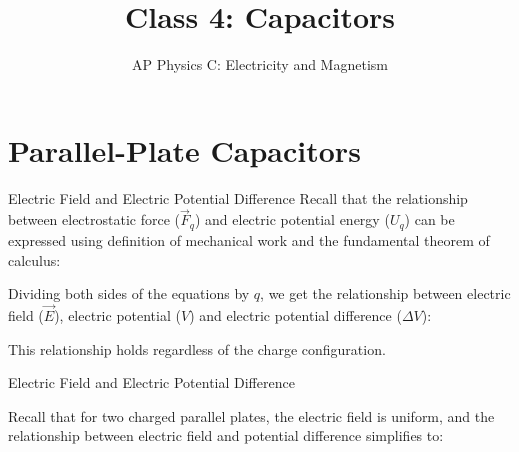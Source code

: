\documentclass[12pt,aspectratio=169]{beamer}
\title{Class 4: Capacitors}
\subtitle{AP Physics C: Electricity and Magnetism}
\begin{document}
\begin{frame}
  \maketitle
\end{frame}


\section{Parallel-Plate Capacitors}

\begin{frame}{Electric Field and Electric Potential Difference}
  Recall that the relationship between electrostatic force ($\vec F_q$) and
  electric potential energy ($U_q$) can be expressed using definition of
  mechanical work and the fundamental theorem of calculus:


  Dividing both sides of the equations by $q$, we get the relationship between
  electric field ($\vec E$), electric potential ($V$) and electric potential
  difference ($\Delta V$):
  

  This relationship holds regardless of the charge configuration.
\end{frame}



\begin{frame}{Electric Field and Electric Potential Difference}
  \begin{center}
  \end{center}
  Recall that for two charged parallel plates, the electric field is uniform,
  and the relationship between electric field and potential difference
  simplifies to:

\end{frame}
\end{document}
